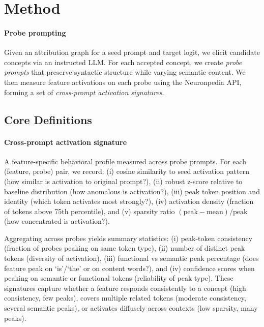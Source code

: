 
\section{Method}
\label{sec:method}

\paragraph{Probe prompting}
Given an attribution graph for a seed prompt and target logit, we elicit candidate concepts via an instructed LLM. For each accepted concept, we create \emph{probe prompts} that preserve syntactic structure while varying semantic content. We then measure feature activations on each probe using the Neuronpedia API, forming a set of \emph{cross-prompt activation signatures}.

\subsection{Core Definitions}

\paragraph{Cross-prompt activation signature}
A feature-specific behavioral profile measured across probe prompts. For each (feature, probe) pair, we record: (i) cosine similarity to seed activation pattern (how similar is activation to original prompt?), (ii) robust z-score relative to baseline distribution (how anomalous is activation?), (iii) peak token position and identity (which token activates most strongly?), (iv) activation density (fraction of tokens above 75th percentile), and (v) sparsity ratio $(\text{peak}-\text{mean})/\text{peak}$ (how concentrated is activation?). 

Aggregating across probes yields summary statistics: (i) peak-token consistency (fraction of probes peaking on same token type), (ii) number of distinct peak tokens (diversity of activation), (iii) functional vs semantic peak percentage (does feature peak on `is'/`the' or on content words?), and (iv) confidence scores when peaking on semantic or functional tokens (reliability of peak type). These signatures capture whether a feature responds consistently to a concept (high consistency, few peaks), covers multiple related tokens (moderate consistency, several semantic peaks), or activates diffusely across contexts (low sparsity, many peaks).

